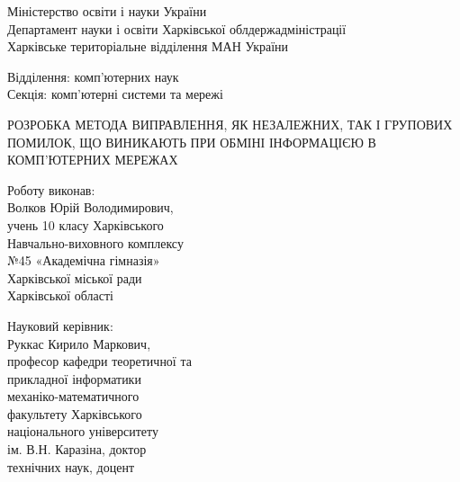 \documentclass[a4paper, 14pt]{article}
\begin{document}
\thispagestyle{empty}

\begin{center}
Міністерство освіти і науки України\\
Департамент науки і освіти Харківської облдержадміністрації\\
Харківське територіальне відділення МАН України\\
\end{center}

\par\null\par

\begin{changemargin}{10cm}{0cm}
Відділення: комп'ютерних наук\\
Секція: комп'ютерні системи та мережі
\end{changemargin}

\par\null\par

\begin{center}
РОЗРОБКА МЕТОДА ВИПРАВЛЕННЯ, ЯК НЕЗАЛЕЖНИХ, ТАК І ГРУПОВИХ
ПОМИЛОК, ЩО ВИНИКАЮТЬ ПРИ ОБМІНІ ІНФОРМАЦІЄЮ В
КОМП'ЮТЕРНИХ МЕРЕЖАХ
\end{center}

\par\null\par\null\par\null

\begin{changemargin}{10cm}{0cm}
Роботу виконав:\\
Волков Юрій Володимирович,\\
учень 10 класу Харківського\\
Навчально-виховного комплексу\\
№45 «Академічна гімназія»\\
Харківської міської ради\\
Харківської області
\end{changemargin}

\par

\begin{changemargin}{10cm}{0cm}
Науковий керівник:\\
Руккас Кирило Маркович,\\
професор кафедри теоретичної та\\
прикладної інформатики\\
механіко-математичного\\
факультету Харківського\\
національного університету\\
ім. В.Н. Каразіна, доктор\\
технічних наук, доцент\\
\vspace*{\fill}
\end{changemargin}
\end{document}
